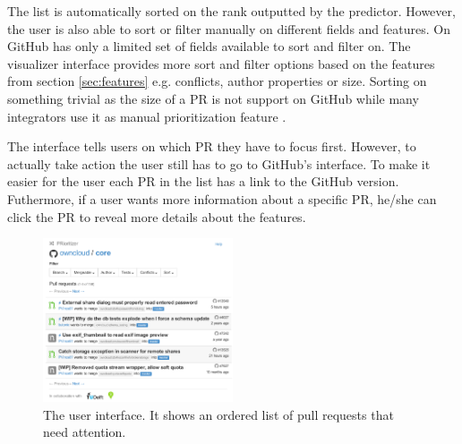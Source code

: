 \begin{description}
The list is automatically sorted on the rank outputted by the predictor.
However, the user is also able to sort or filter manually on different fields and features.
On GitHub has only a limited set of fields available to sort and filter on.
The visualizer interface provides more sort and filter options based on the features from section \ref{sec:features} e.g. conflicts, author properties or size.
Sorting on something trivial as the size of a PR is not support on GitHub while many integrators use it as manual prioritization feature \cite{GZSD15}.

The interface tells users on which PR they have to focus first.
However, to actually take action the user still has to go to GitHub's interface.
To make it easier for the user each PR in the list has a link to the GitHub version.
Futhermore, if a user wants more information about a specific PR, he/she can click the PR to reveal more details about the features.
\end{description}

\begin{figure}
  \centering
  \includegraphics[width=0.5\textwidth]{../figs/interface.pdf}
  \caption[The user interface]
   {The user interface. It shows an ordered list of pull requests that need attention.}
  \label{fig:ui}
\end{figure}
